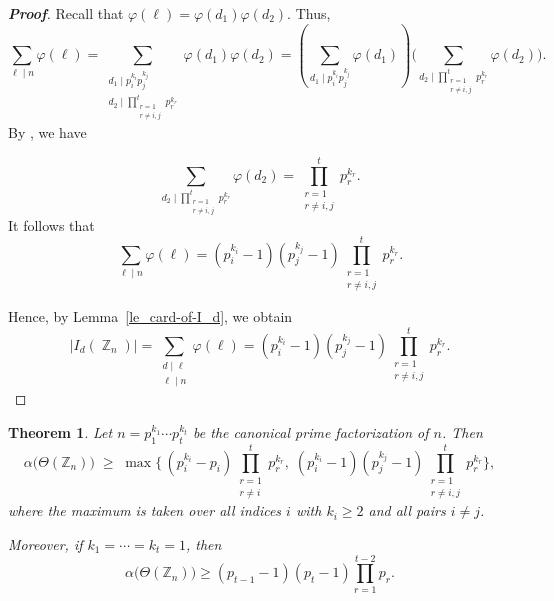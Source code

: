 \documentclass{amsart}
\theoremstyle{plain}
\newtheorem{theorem}{Theorem}[section]
\theoremstyle{definition}
\DeclareMathOperator{\Z}{\mathbb{Z}}
\begin{document}
\begin{proof}[\textbf{Proof}]
Recall that $\varphi(\ell) = \varphi(d_1)\varphi(d_2)$. Thus,
\[\sum_{\ell\mid n}\varphi(\ell)= \sum_{\substack{d_{1}\mid p_{i}^{k_i} p_{j}^{k_j} \\ d_2 \mid \prod_{\substack{r=1\\r\neq i, j}}^{t}p_r^{k_r}}} \varphi(d_1) \varphi(d_2)
=\left(\sum_{d_1 \mid p_{i}^{k_i} p_{j}^{k_j}}\varphi(d_1)\right) \Biggl(\sum_{d_2\mid \prod_{\substack{r=1\\r\neq i,j}}^{t}p_r^{k_r}}\varphi(d_2)\Biggr).\]
 By \cite[Theorem~7.6]{burton-b07}, we have 
 
 
 \[\sum_{d_2\mid \prod_{\substack{r=1\\r\neq i,j}}^{t}p_r^{k_r}}\varphi(d_2) = \prod_{\substack{r=1\\r\neq i,j}}^{t}p_r^{k_r}.\] It follows that 
\[\sum_{\ell\mid n}\varphi(\ell)= (p_i^{k_i} - 1) (p_j^{k_j} - 1)\prod_{\substack{r=1\\r\neq i,j}}^{t}p_r^{k_r}.\]

Hence, by Lemma~\ref{le_card-of-I_d}, we obtain
\[|I_{d}(\Z_{n})| = \sum_{\substack{d \mid \ell \\ \ell \mid n}} \varphi(\ell)=
(p_i^{k_i} - 1) (p_j^{k_j} - 1)\prod_{\substack{r=1\\r\neq i,j}}^{t}p_r^{k_r}.\]
\end{proof}



\begin{theorem}\label{th_ind-num-cyclic-group}
Let $n= p_1^{k_1}\cdots p_t^{k_t}$ be the canonical prime factorization of $n$. Then
\[
	\alpha\bigl(\Theta(\mathbb{Z}_n)\bigr) \;\geq\; \max\Biggl\{
	\,(p_i^{k_i} - p_i)   \prod_{\substack{r=1\\ r\neq i}}^t p_r^{k_r},\;
	(p_i^{k_i} - 1)(p_j^{k_j} - 1)\prod_{\substack{r=1\\r\neq i,j}}^t p_r^{k_r}
	\Biggr\},\]
	where the maximum is taken over all indices $i$ with $k_i \geq 2$ and all pairs $i \neq j$.

\vspace{0.2mm}
Moreover, if $k_1 = \cdots = k_t = 1$, then \[\alpha\!\bigl(\Theta(\mathbb{Z}_{n})\bigr)
\geq (p_{t-1}-1)(p_t-1) \prod_{r=1}^{t-2} p_r.\]
\end{theorem}
\end{document}
